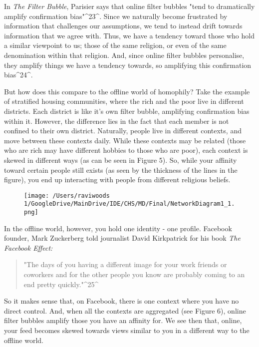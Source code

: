\documentclass[]{article}
\begin{document}
In \emph{The Filter Bubble}, Parisier says that online filter bubbles
"tend to dramatically amplify confirmation bias"\^{}23\^{}. Since we
naturally become frustrated by information that challenges our
assumptions, we tend to instead drift towards information that we agree
with. Thus, we have a tendency toward those who hold a similar viewpoint
to us; those of the same religion, or even of the same denomination
within that religion. And, since online filter bubbles personalise, they
amplify things we have a tendency towards, so amplifying this
confirmation bias\^{}24\^{}.

But how does this compare to the offline world of homophily? Take the
example of stratified housing communities, where the rich and the poor
live in different districts. Each district is like it's own filter
bubble, amplifying confirmation bias within it. However, the difference
lies in the fact that each member is not confined to their own district.
Naturally, people live in different contexts, and move between these
contexts daily. While these contexts may be related (those who are rich
may have different hobbies to those who are poor), each context is
skewed in different ways (as can be seen in Figure 5). So, while your
affinity toward certain people still exists (as seen by the thickness of
the lines in the figure), you end up interacting with people from
different religious beliefs.

\begin{figure}
\centering
\texttt{[image: /Users/raviwoods 1/GoogleDrive/MainDrive/IDE/CHS/MD/Final/NetworkDiagram1\_1.png]}
\caption{}
\end{figure}

In the offline world, however, you hold one identity - one profile.
Facebook founder, Mark Zuckerberg told journalist David Kirkpatrick for
his book \emph{The Facebook Effect:}

\begin{quote}
"The days of you having a different image for your work friends or
coworkers and for the other people you know are probably coming to an
end pretty quickly."\^{}25\^{}
\end{quote}

So it makes sense that, on Facebook, there is one context where you have
no direct control. And, when all the contexts are aggregated (see Figure
6), online filter bubbles amplify those you have an affinity for. We see
then that, online, your feed becomes skewed towards views similar to you
in a different way to the offline world.
\end{document}
